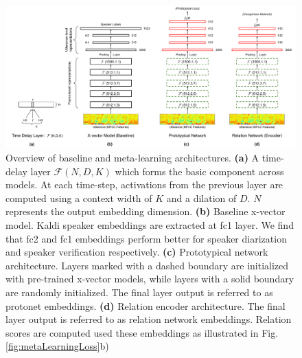 \begin{figure}
    \centering
    \includegraphics[width=\textwidth]{fig/meta_learning_arch.pdf}
    \caption{Overview of baseline and meta-learning architectures. \textbf{(a)} A time-delay layer $\mathcal{F}(N,D,K)$ which forms the basic component across models. At each time-step, activations from the previous layer are computed using a context width of $K$ and a dilation of $D$. $N$ represents the output embedding dimension. \textbf{(b)} Baseline x-vector model. Kaldi speaker embeddings are extracted at fc1 layer. We find that fc2 and fc1 embeddings perform better for speaker diarization and speaker verification respectively. \textbf{(c)} Prototypical network architecture. Layers marked with a dashed boundary are initialized with pre-trained x-vector models, while layers with a solid boundary are randomly initialized. The final layer output is referred to as protonet embeddings. \textbf{(d)} Relation encoder architecture. The final layer output is referred to as relation network embeddings. Relation scores are computed used these embeddings as illustrated in Fig. \ref{fig:metaLearningLoss}b) }
    \label{fig:metaLearningArch}
\end{figure}




